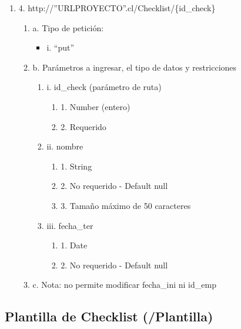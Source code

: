 \begin{enumerate}
    \item 4. http://”URLPROYECTO”.cl/Checklist/\{id\_check\}
    \begin{enumerate}
        \item a. Tipo de petición:
            \begin{itemize}
               \item i. “put”
            \end{itemize}
        \item b. Parámetros a ingresar, el tipo de datos y restricciones
            \begin{enumerate}
                \item i. id\_check (parámetro de ruta)
                    \begin{enumerate}
                        \item 1. Number (entero)
                        \item 2. Requerido
                    \end{enumerate}
                \item ii. nombre
                    \begin{enumerate}
                        \item 1. String
                        \item 2. No requerido - Default null
                        \item 3. Tamaño máximo de 50 caracteres
                    \end{enumerate}
                \item iii. fecha\_ter
                    \begin{enumerate}
                        \item 1. Date
                        \item 2. No requerido - Default null
                    \end{enumerate}
            \end{enumerate}
        \item c. Nota: no permite modificar fecha\_ini ni id\_emp
    \end{enumerate}
\end{enumerate}

\subsection{Plantilla de Checklist (/Plantilla)}

